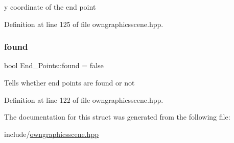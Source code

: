 y coordinate of the end point 

Definition at line 125 of file owngraphicsscene.\+hpp.

\mbox{\label{structEnd__Points_aff9dd173210b07bb087d70cf5ec9439f}} 
\subsubsection{\texorpdfstring{found}{found}}
{\footnotesize\ttfamily bool End\+\_\+\+Points\+::found = false}

Tells whether end points are found or not 

Definition at line 122 of file owngraphicsscene.\+hpp.



The documentation for this struct was generated from the following file\+:\begin{DoxyCompactItemize}
\item 
include/\mbox{\hyperlink{owngraphicsscene_8hpp}{owngraphicsscene.\+hpp}}\end{DoxyCompactItemize}
